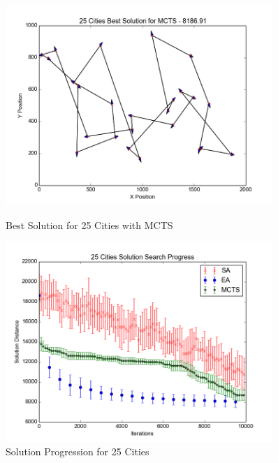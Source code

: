 \begin{figure}[H]
\begin{minipage}{0.45\textwidth}
        \includegraphics[width=0.9\textwidth]{25City_MCTS.png} %
        \caption{Best Solution for 25 Cities with MCTS}
        \label{fig:25city_MCTS}
    \end{minipage}\hfill
    \begin{minipage}{0.45\textwidth}
		\centering
		\includegraphics[width=0.9\textwidth]{25City_Solutions.png}
		\caption{Solution Progression for 25 Cities}
		\label{fig:25city_Solution}
    \end{minipage}\hfill
\end{figure}